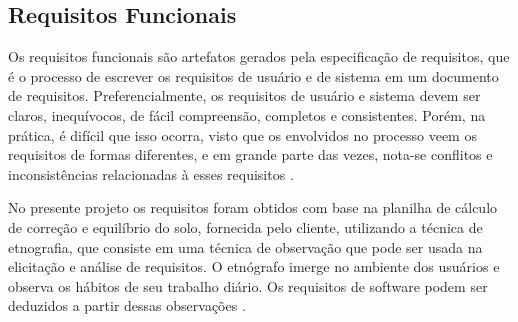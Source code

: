 \subsection{Requisitos Funcionais}
\label{sec:titSecReqFunc}

Os requisitos funcionais são artefatos gerados pela especificação de requisitos, que é o processo de escrever os requisitos de usuário e de sistema em um documento de requisitos. Preferencialmente, os requisitos de usuário e sistema devem ser claros, inequívocos, de fácil compreensão, completos e consistentes. Porém, na prática, é difícil que isso ocorra, visto que os envolvidos no processo veem os requisitos de formas diferentes, e em grande parte das vezes, nota-se conflitos e inconsistências relacionadas à esses requisitos \cite{Sommerville10}.

No presente projeto os requisitos foram obtidos com base na planilha de cálculo de correção e equilíbrio do solo, fornecida pelo cliente, utilizando a técnica de etnografia, que consiste em uma técnica de observação que pode ser usada na elicitação e análise de requisitos. O etnógrafo imerge no ambiente dos usuários e observa os hábitos de seu trabalho diário. Os requisitos de software podem ser deduzidos a partir dessas observações \cite{Sommerville10}.

